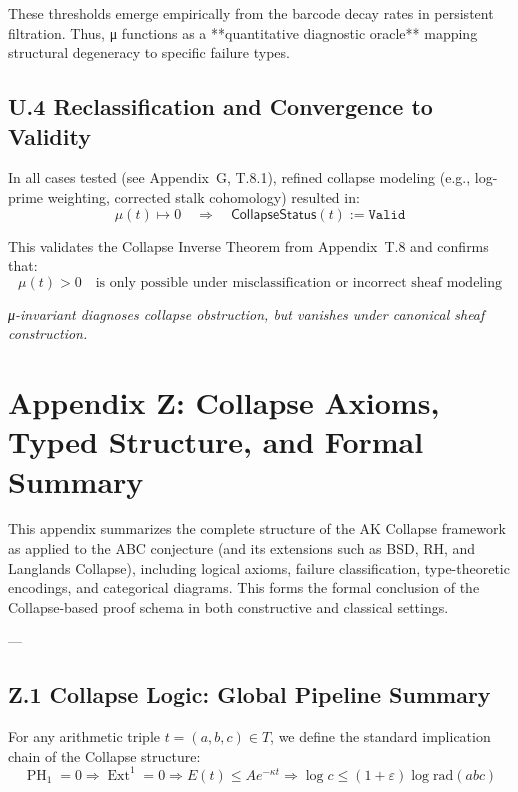 \documentclass[11pt]{article}
\DeclareMathOperator{\Ext}{Ext}
\DeclareMathOperator{\PH}{PH}
\begin{document}
These thresholds emerge empirically from the barcode decay rates in persistent filtration.  
Thus, μ functions as a **quantitative diagnostic oracle** mapping structural degeneracy  
to specific failure types.

\subsection*{U.4 Reclassification and Convergence to Validity}

In all cases tested (see Appendix~G, T.8.1), refined collapse modeling  
(e.g., log-prime weighting, corrected stalk cohomology) resulted in:
\[
\mu(t) \mapsto 0 \quad \Rightarrow \quad \mathsf{CollapseStatus}(t) := \texttt{Valid}
\]

This validates the Collapse Inverse Theorem from Appendix~T.8 and confirms that:
\[
\mu(t) > 0 \quad \text{is only possible under misclassification or incorrect sheaf modeling}
\]

\begin{center}
\textit{μ-invariant diagnoses collapse obstruction, but vanishes under canonical sheaf construction.}
\end{center}



\section*{Appendix Z: Collapse Axioms, Typed Structure, and Formal Summary}

This appendix summarizes the complete structure of the AK Collapse framework as applied to the ABC conjecture  
(and its extensions such as BSD, RH, and Langlands Collapse), including logical axioms, failure classification,  
type-theoretic encodings, and categorical diagrams. This forms the formal conclusion of the Collapse-based proof  
schema in both constructive and classical settings.

---

\subsection*{Z.1 Collapse Logic: Global Pipeline Summary}

For any arithmetic triple \( t = (a,b,c) \in T \), we define the standard implication chain of the Collapse structure:
\[
\boxed{
\PH_1 = 0 \Rightarrow \Ext^1 = 0 \Rightarrow E(t) \leq Ae^{-\kappa t} \Rightarrow \log c \leq (1+\varepsilon)\log \mathrm{rad}(abc)
}
\]
\end{document}
